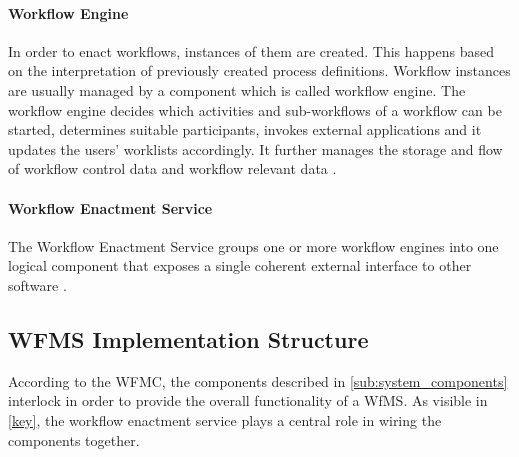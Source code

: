     \paragraph{Workflow Engine} %
    \label{par:workflow_engine}
      In order to enact workflows, instances of them are created. This happens based on the interpretation of previously created process definitions. Workflow instances are usually managed by a component which is called workflow engine. The workflow engine decides which activities and sub-workflows of a workflow can be started, determines suitable participants, invokes external applications and it updates the users' worklists accordingly. It further manages the storage and flow of workflow control data and workflow relevant data \cite{Hollingsworth1995Wfmc}.

    \paragraph{Workflow Enactment Service} %
    \label{par:workflow_enactment_service}
      The Workflow Enactment Service groups one or more workflow engines into one logical component that exposes a single coherent external interface to other software \cite{Hollingsworth1995Wfmc}.

  \subsection{WFMS Implementation Structure} %
  \label{sub:wfms_implementation_structure}
    According to the \ac{WFMC}, the components described in \ref{sub:system_components} interlock in order to provide the overall functionality of a \ac{WfMS}. As visible in \ref{key}, the workflow enactment service plays a central role in wiring the components together.

